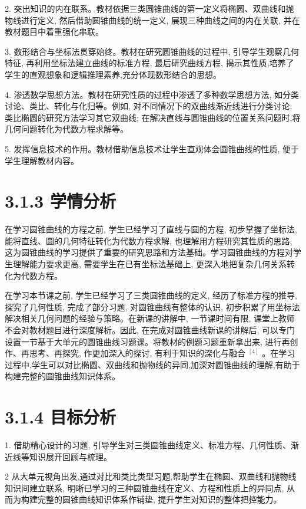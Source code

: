 \documentclass[10pt]{article}
\begin{document}
2. 突出知识的内在联系。教材依据三类圆锥曲线的第一定义将椭圆、双曲线和抛物线进行定义, 然后借助圆锥曲线的统一定义, 展现三种曲线之间的内在关联, 并在教材题目中着重强化串联。

3. 数形结合与坐标法贯穿始终。教材在研究圆锥曲线的过程中, 引导学生观察几何特征, 再利用坐标法建立曲线的标准方程, 最后研究曲线方程, 揭示其性质,培养了学生的直观想象和逻辑推理素养,充分体现数形结合的思想。

4. 渗透数学思想方法。教材在研究性质的过程中渗透了多种数学思想方法, 如分类讨论、类比、转化与化归等。例如, 对不同情况下的双曲线渐近线进行分类讨论; 类比椭圆的研究方法学习其它双曲线; 在解决直线与圆锥曲线的位置关系问题时,将几何问题转化为代数方程求解等。

5. 发挥信息技术的作用。教材借助信息技术让学生直观体会圆锥曲线的性质, 便于学生理解教材内容。

\section*{3.1.3 学情分析}

在学习圆锥曲线的方程之前, 学生已经学习了直线与圆的方程, 初步掌握了坐标法, 能将直线、圆的几何特征转化为代数方程求解, 也理解用方程研究其性质的思路, 这为圆锥曲线的学习提供了重要的研究思路和方法基础。学习圆锥曲线的方程对学生理解能力要求更高, 需要学生在已有坐标法基础上, 更深入地把复杂几何关系转化为代数方程。

在学习本节课之前, 学生已经学习了三类圆锥曲线的定义, 经历了标准方程的推导, 探究了几何性质, 完成了部分习题, 对圆锥曲线有整体的认识, 初步积累了用坐标法解决相关几何问题的经验与策略。在新课的讲解中, 一节课时间有限, 课堂上教师不会对教材题目进行深度解析。因此, 在完成对圆锥曲线新课的讲解后, 可以专门设置一节基于大单元的圆锥曲线习题课。将教材的例题习题重新拿出来, 进行再创作、再思考、再探究, 作更加深入的探讨, 有利于知识的深化与融合 \({}^{\left\lbrack  4\right\rbrack  }\) 。在学习过程中,学生可以对比椭圆、双曲线和抛物线的异同,加深对圆锥曲线的理解,有助于构建完整的圆锥曲线知识体系。

\section*{3.1.4 目标分析}

1. 借助精心设计的习题, 引导学生对三类圆锥曲线定义、标准方程、几何性质、渐近线等知识展开回顾与梳理。

2 从大单元视角出发,通过对比和类比类型习题,帮助学生在椭圆、双曲线和抛物线知识间建立联系, 明晰已学习的三种圆锥曲线在定义、方程和性质上的异同点, 从而为构建完整的圆锥曲线知识体系作铺垫, 提升学生对知识的整体把控能力。
\end{document}
